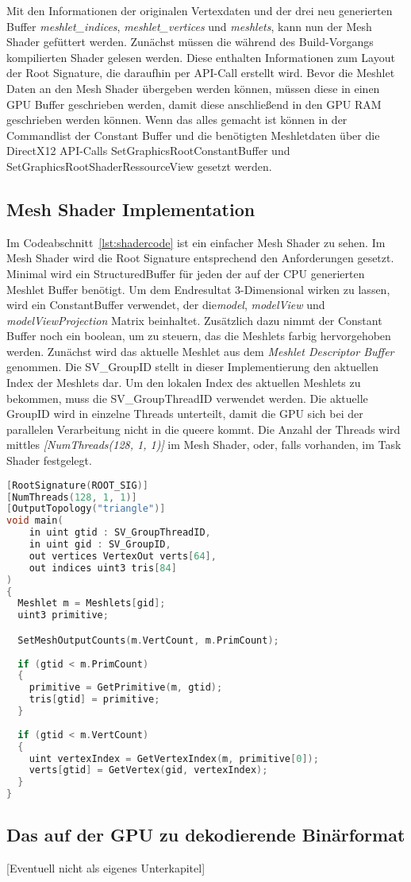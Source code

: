Mit den Informationen der originalen Vertexdaten und der drei neu generierten Buffer \textit{meshlet\_indices}, \textit{meshlet\_vertices} und \textit{meshlets}, kann nun der Mesh Shader gefüttert werden.
Zunächst müssen die während des Build-Vorgangs kompilierten Shader gelesen werden.
Diese enthalten Informationen zum Layout der Root Signature, die daraufhin per API-Call erstellt wird.
Bevor die Meshlet Daten an den Mesh Shader übergeben werden können, müssen diese in einen GPU Buffer geschrieben werden, damit diese anschließend in den GPU RAM geschrieben werden können.
Wenn das alles gemacht ist können in der Commandlist der Constant Buffer und die benötigten Meshletdaten über die DirectX12 API-Calls SetGraphicsRootConstantBuffer und SetGraphicsRootShaderRessourceView gesetzt werden.

\subsection{Mesh Shader Implementation}
\label{subsec:mesh_shader_impl}
Im Codeabschnitt~\ref{lst:shadercode} ist ein einfacher Mesh Shader zu sehen.
Im Mesh Shader wird die Root Signature entsprechend den Anforderungen gesetzt.
Minimal wird ein StructuredBuffer für jeden der auf der CPU generierten Meshlet Buffer benötigt.
Um dem Endresultat 3-Dimensional wirken zu lassen, wird ein ConstantBuffer verwendet, der die\textit{model}, \textit{modelView} und \textit{modelViewProjection} Matrix beinhaltet. 
Zusätzlich dazu nimmt der Constant Buffer noch ein boolean, um zu steuern, das die Meshlets farbig hervorgehoben werden.
Zunächst wird das aktuelle Meshlet aus dem \textit{Meshlet Descriptor Buffer} genommen.
Die SV\_GroupID stellt in dieser Implementierung den aktuellen Index der Meshlets dar.
Um den lokalen Index des aktuellen Meshlets zu bekommen, muss die SV\_GroupThreadID verwendet werden.
Die aktuelle GroupID wird in einzelne Threads unterteilt, damit die GPU sich bei der parallelen Verarbeitung nicht in die queere kommt.
Die Anzahl der Threads wird mittles \textit{[NumThreads(128, 1, 1)]} im Mesh Shader, oder, falls vorhanden, im Task Shader festgelegt.

\newpage \begin{lstlisting}[language = C++, caption = Mesh Shader Main, label=lst:shadercode]
[RootSignature(ROOT_SIG)]
[NumThreads(128, 1, 1)]
[OutputTopology("triangle")]
void main(
    in uint gtid : SV_GroupThreadID,
    in uint gid : SV_GroupID,
    out vertices VertexOut verts[64],
    out indices uint3 tris[84]
)
{
  Meshlet m = Meshlets[gid];
  uint3 primitive;

  SetMeshOutputCounts(m.VertCount, m.PrimCount);
  
  if (gtid < m.PrimCount)
  {
    primitive = GetPrimitive(m, gtid);
    tris[gtid] = primitive;
  }
  
  if (gtid < m.VertCount)
  {
    uint vertexIndex = GetVertexIndex(m, primitive[0]);
    verts[gtid] = GetVertex(gid, vertexIndex);
  }
}
\end{lstlisting}

\subsection{Das auf der GPU zu dekodierende Binärformat}
\label{subsec:binary_format}
[Eventuell nicht als eigenes Unterkapitel]
